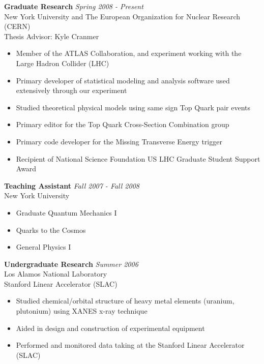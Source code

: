 \documentclass[9pt]{article}
\newenvironment{changemargin}[2]{%
  \begin{list}{}{%
    \setlength{\topsep}{0pt}%
    \setlength{\leftmargin}{#1}%
    \setlength{\rightmargin}{#2}%
    \setlength{\listparindent}{\parindent}%
    \setlength{\itemindent}{\parindent}%
    \setlength{\parsep}{\parskip}%
  }%
  \item[]}{\end{list}
}
\newenvironment{body} {
	\vspace*{-16pt}
	\begin{changemargin}{-0.25in}{-0.5in}
  }	
	{\end{changemargin}
}
\begin{document}
\begin{body}
	\vspace{14pt}
	\textbf{Graduate Research} \hfill \emph{Spring 2008 - Present}\\
	New York University and The European Organization for Nuclear Research (CERN) \\
        Thesis Advisor: Kyle Cranmer \\

	\vspace*{-4pt}

        \begin{itemize}
        \item Member of the ATLAS Collaboration, and experiment working with the Large Hadron Collider (LHC)
        \item Primary developer of statistical modeling and analysis software used extensively through our experiment
        \item Studied theoretical physical models using same sign Top Quark pair events
        \item Primary editor for the Top Quark Cross-Section Combination group
        \item Primary code developer for the Missing Transverse Energy trigger
        \item Recipient of National Science Foundation US LHC Graduate Student Support Award
        \end{itemize}
        \medskip

	\textbf {Teaching Assistant} \hfill \emph{Fall 2007 - Fall 2008}\\
        New York University \\
	\vspace*{-4pt}
	\begin{itemize} \itemsep -0pt
		\item Graduate Quantum Mechanics I
		\item Quarks to the Cosmos
                \item General Physics I
	\end{itemize}

        \medskip

	\textbf {Undergraduate Research} \hfill \emph{Summer 2006}\\
        Los Alamos National Laboratory \\
        Stanford Linear Accelerator (SLAC) \\

        \begin{itemize}
          \item Studied chemical/orbital structure of heavy metal elements (uranium, plutonium) using XANES x-ray technique
          \item Aided in design and construction of experimental equipment
          \item Performed and monitored data taking at the Stanford Linear Accelerator (SLAC) 
        \end{itemize}

\end{body}
\end{document}
